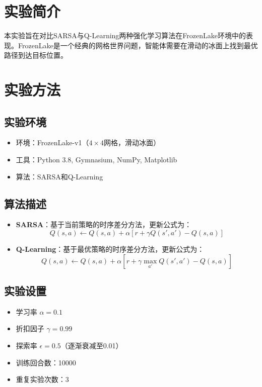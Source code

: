 \documentclass[12pt]{article}
\title{}
\author{}
\date{}
\begin{document}
\maketitle

\section{实验简介}
本实验旨在对比SARSA与Q-Learning两种强化学习算法在FrozenLake环境中的表现。FrozenLake是一个经典的网格世界问题，智能体需要在滑动的冰面上找到最优路径到达目标位置。

\section{实验方法}
\subsection{实验环境}
\begin{itemize}
    \item 环境：FrozenLake-v1（$4 \times 4$网格，滑动冰面）
    \item 工具：Python 3.8, Gymnasium, NumPy, Matplotlib
    \item 算法：SARSA和Q-Learning
\end{itemize}

\subsection{算法描述}
\begin{itemize}
    \item \textbf{SARSA}：基于当前策略的时序差分方法，更新公式为：
    \[
    Q(s, a) \leftarrow Q(s, a) + \alpha \left[ r + \gamma Q(s', a') - Q(s, a) \right]
    \]
    \item \textbf{Q-Learning}：基于最优策略的时序差分方法，更新公式为：
    \[
    Q(s, a) \leftarrow Q(s, a) + \alpha \left[ r + \gamma \max_{a'} Q(s', a') - Q(s, a) \right]
    \]
\end{itemize}

\subsection{实验设置}
\begin{itemize}
    \item 学习率 $\alpha = 0.1$
    \item 折扣因子 $\gamma = 0.99$
    \item 探索率 $\epsilon = 0.5$（逐渐衰减至0.01）
    \item 训练回合数：10000
    \item 重复实验次数：3
\end{itemize}
\end{document}
